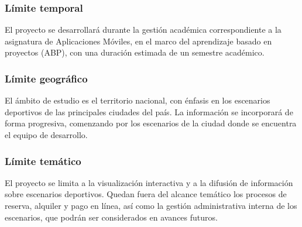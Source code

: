 \subsubsection{L\'imite temporal}

El proyecto se desarrollar\'a durante la gesti\'on acad\'emica correspondiente a la
asignatura de Aplicaciones M\'oviles, en el marco del aprendizaje basado en
proyectos (ABP), con una duraci\'on estimada de un semestre acad\'emico.

\subsubsection{L\'imite geogr\'afico}

El \'ambito de estudio es el territorio nacional, con \'enfasis en los
escenarios deportivos de las principales ciudades del pa\'is. La informaci\'on se
incorporar\'a de forma progresiva, comenzando por los escenarios de la ciudad
donde se encuentra el equipo de desarrollo.

\subsubsection{L\'imite tem\'atico}

El proyecto se limita a la visualizaci\'on interactiva y a la difusi\'on de
informaci\'on sobre escenarios deportivos. Quedan fuera del alcance tem\'atico
los procesos de reserva, alquiler y pago en l\'inea, as\'i como la gesti\'on
administrativa interna de los escenarios, que podr\'an ser considerados en
avances futuros.
